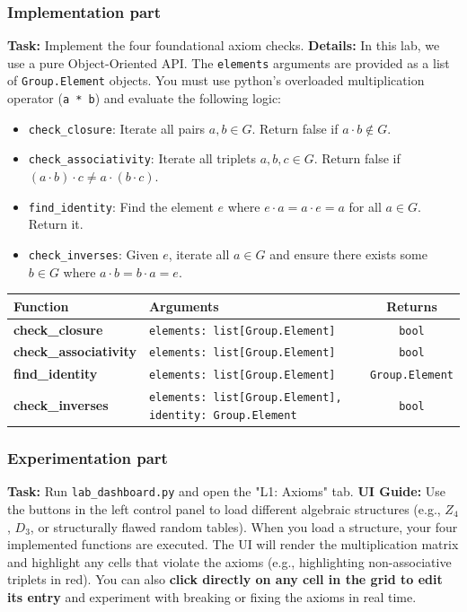 \documentclass[11pt]{article}
\begin{document}
\subsubsection*{Implementation part}
\textbf{Task:} Implement the four foundational axiom checks. 
\textbf{Details:} In this lab, we use a pure Object-Oriented API. The \lstinline|elements| arguments are provided as a list of \lstinline|Group.Element| objects. You must use python's overloaded multiplication operator (\lstinline|a * b|) and evaluate the following logic:
\begin{itemize}
    \item \lstinline|check_closure|: Iterate all pairs $a, b \in G$. Return false if $a \cdot b \notin G$.
    \item \lstinline|check_associativity|: Iterate all triplets $a, b, c \in G$. Return false if $(a \cdot b) \cdot c \neq a \cdot (b \cdot c)$.
    \item \lstinline|find_identity|: Find the element $e$ where $e \cdot a = a \cdot e = a$ for all $a \in G$. Return it.
    \item \lstinline|check_inverses|: Given $e$, iterate all $a \in G$ and ensure there exists some $b \in G$ where $a \cdot b = b \cdot a = e$.
\end{itemize}

\begin{center}
\renewcommand{\arraystretch}{1.5}
\begin{tabularx}{\textwidth}{@{} >{\bfseries}l X c @{}}
\toprule
Function & Arguments & Returns \\ \midrule
check\_closure & \lstinline|elements: list[Group.Element]| & \lstinline|bool| \\
check\_associativity & \lstinline|elements: list[Group.Element]| & \lstinline|bool| \\
find\_identity & \lstinline|elements: list[Group.Element]| & \lstinline|Group.Element| \\
check\_inverses & \lstinline|elements: list[Group.Element], identity: Group.Element| & \lstinline|bool| \\
\bottomrule
\end{tabularx}
\end{center}

\subsubsection*{Experimentation part}
\textbf{Task:} Run \lstinline|lab_dashboard.py| and open the "L1: Axioms" tab. 
\textbf{UI Guide:} Use the buttons in the left control panel to load different algebraic structures (e.g., $Z_4$, $D_3$, or structurally flawed random tables). When you load a structure, your four implemented functions are executed. The UI will render the multiplication matrix and highlight any cells that violate the axioms (e.g., highlighting non-associative triplets in red). You can also \textbf{click directly on any cell in the grid to edit its entry} and experiment with breaking or fixing the axioms in real time.
\end{document}
